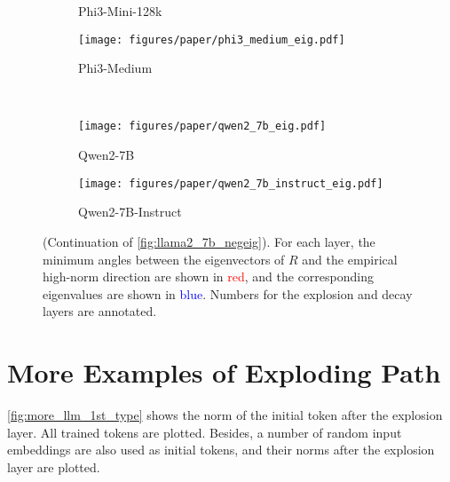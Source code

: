\begin{figure*}[!t]
\begin{subfigure}[t]{0.49\textwidth}
        \caption{Phi3-Mini-128k}\label{fig:phi3_mini_128k_eig}
    \end{subfigure}
    \begin{subfigure}[t]{0.49\textwidth}
        \texttt{[image: figures/paper/phi3\_medium\_eig.pdf]}
        \caption{Phi3-Medium}\label{fig:phi3_medium_eig}
    \end{subfigure}\\
    \begin{subfigure}[t]{0.49\textwidth}
        \texttt{[image: figures/paper/qwen2\_7b\_eig.pdf]}
        \caption{Qwen2-7B}\label{fig:qwen2_7b_eig}
    \end{subfigure}
    \begin{subfigure}[t]{0.49\textwidth}
        \texttt{[image: figures/paper/qwen2\_7b\_instruct\_eig.pdf]}
        \caption{Qwen2-7B-Instruct}\label{fig:qwen2_7b_instruct_eig}
    \end{subfigure}
    \caption{(Continuation of \cref{fig:llama2_7b_negeig}).
    For each layer, the minimum angles between the eigenvectors of \(R\) and the empirical high-norm direction are shown in \textcolor{red}{red}, and the corresponding eigenvalues are shown in \textcolor{blue}{blue}.
    Numbers for the explosion and decay layers are annotated.
    }\label{fig:more_llm_eig}
\end{figure*}

\section{More Examples of Exploding Path}\label{sec:more_development}

\cref{fig:more_llm_1st_type} shows the norm of the initial token after the explosion layer.
All trained tokens are plotted.
Besides, a number of random input embeddings are also used as initial tokens, and their norms after the explosion layer are plotted.


